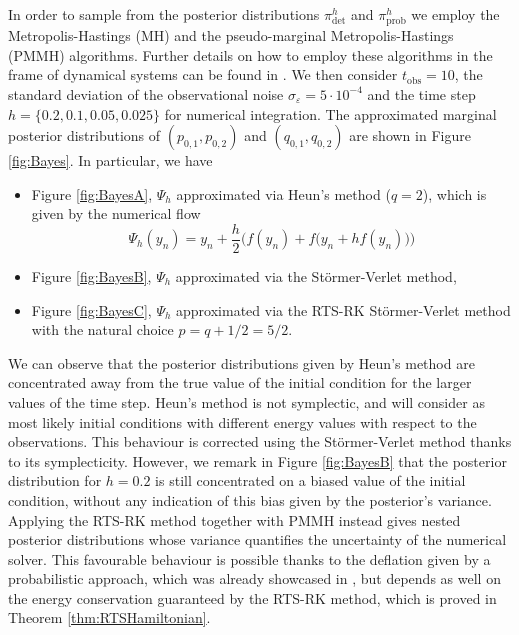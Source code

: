 \documentclass{siamart1116}
\numberwithin{theorem}{section}
\newcommand{\epl}{\varepsilon}
\begin{document}
In order to sample from the posterior distributions $\pi^h_{\mathrm{det}}$ and $\pi^h_{\mathrm{prob}}$ we employ the Metropolis-Hastings (MH) and the pseudo-marginal Metropolis-Hastings (PMMH) algorithms. Further details on how to employ these algorithms in the frame of dynamical systems can be found in \cite{AbG18}. We then consider $t_{\mathrm{obs}} = 10$, the standard deviation of the observational noise $\sigma_\epl = 5 \cdot 10^{-4}$ and the time step $h = \{0.2, 0.1, 0.05, 0.025\}$ for numerical integration. The approximated marginal posterior distributions of $(p_{0,1}, p_{0, 2})$ and $(q_{0, 1}, q_{0, 2})$ are shown in Figure \ref{fig:Bayes}. In particular, we have
\begin{itemize}[label = -]
	\item Figure \ref{fig:BayesA}, $\Psi_h$ approximated via Heun's method \cite{Heu00} ($q = 2$), which is given by the numerical flow 
	\begin{equation*}
		\Psi_h(y_n) = y_n + \frac{h}{2}\Big(f(y_n) + f\big(y_n + hf(y_n)\big)\Big)
	\end{equation*}
	\item Figure \ref{fig:BayesB}, $\Psi_h$ approximated via the Störmer-Verlet method,
	\item Figure \ref{fig:BayesC}, $\Psi_h$ approximated via the RTS-RK Störmer-Verlet method with the natural choice $p = q+1/2 = 5/2$.
\end{itemize}
We can observe that the posterior distributions given by Heun's method are concentrated away from the true value of the initial condition for the larger values of the time step. Heun's method is not symplectic, and will consider as most likely initial conditions with different energy values with respect to the observations. This behaviour is corrected using the Störmer-Verlet method thanks to its symplecticity. However, we remark in Figure \ref{fig:BayesB} that the posterior distribution for $h = 0.2$ is still concentrated on a biased value of the initial condition, without any indication of this bias given by the posterior's variance. Applying the RTS-RK method together with PMMH instead gives nested posterior distributions whose variance quantifies the uncertainty of the numerical solver. This favourable behaviour is possible thanks to the deflation given by a probabilistic approach, which was already showcased in \cite{AbG18, CGS16, COS17}, but depends as well on the energy conservation guaranteed by the RTS-RK method, which is proved in Theorem \ref{thm:RTSHamiltonian}.
\end{document}
